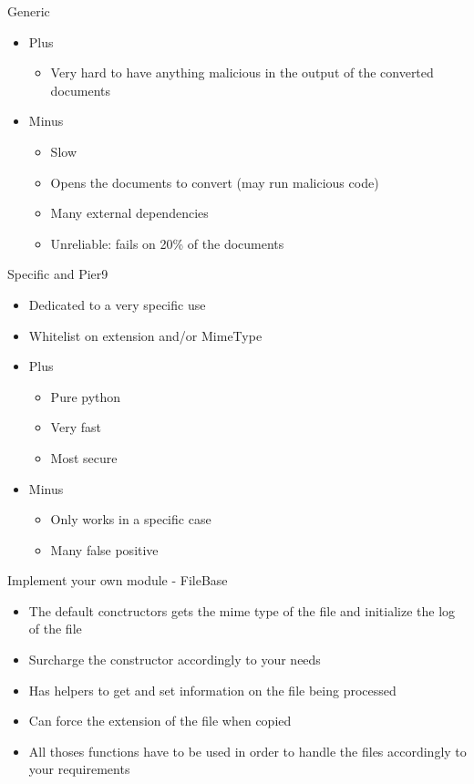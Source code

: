 \begin{frame}[fragile]{Generic}
    \begin{itemize}
        \item Plus
        \begin{itemize}
            \item Very hard to have anything malicious in the output of the converted documents
        \end{itemize}
        \item Minus
        \begin{itemize}
            \item Slow
            \item Opens the documents to convert (may run malicious code)
            \item Many external dependencies
            \item Unreliable: fails on 20\% of the documents
        \end{itemize}
    \end{itemize}
\end{frame}

\begin{frame}[fragile]{Specific and Pier9}
    \begin{itemize}
        \item Dedicated to a very specific use
        \item Whitelist on extension and/or MimeType
        \item Plus
        \begin{itemize}
            \item Pure python
            \item Very fast
            \item Most secure
        \end{itemize}
        \item Minus
        \begin{itemize}
            \item Only works in a specific case
            \item Many false positive
        \end{itemize}
   \end{itemize}
\end{frame}

\begin{frame}[fragile]{Implement your own module - FileBase}
    \begin{itemize}
        \item The default conctructors gets the mime type of the file and initialize the log of the file
        \item Surcharge the constructor accordingly to your needs
        \item Has helpers to get and set information on the file being processed
        \item Can force the extension of the file when copied
        \item All thoses functions have to be used in order to handle the files accordingly to your requirements
   \end{itemize}
\end{frame}

